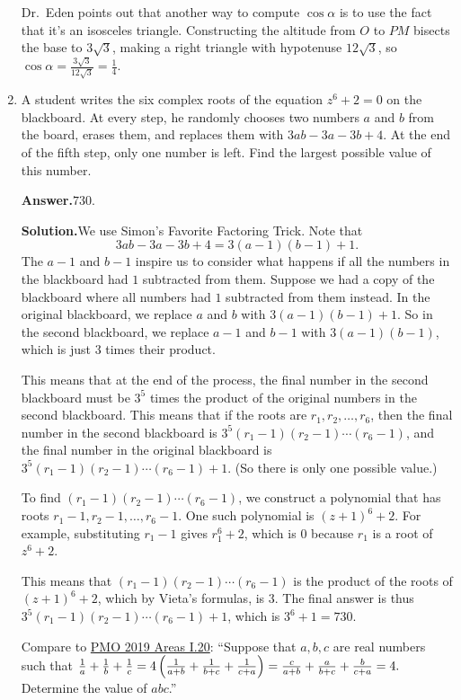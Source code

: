 \documentclass[11pt,paper=letter]{scrartcl}
\newcommand{\ans}{{\sffamily \bfseries Answer.}\;}
\newcommand{\sol}{{\sffamily \bfseries Solution.}\;}
\newcommand{\rem}[1]{{\small \sffamily \sansmath {\bfseries Remark.} #1}}
\begin{document}
\begin{enumerate}[left=0pt]
\rem{Dr.~Eden points out that another way to compute $\cos \alpha$ is to use the fact that it's an isosceles triangle. Constructing the altitude from $O$ to $PM$ bisects the base to $3\sqrt{3}$, making a right triangle with hypotenuse $12\sqrt{3}$, so $\cos \alpha = \frac{3\sqrt{3}}{12\sqrt{3}} = \frac{1}{4}$.}

\item A student writes the six complex roots of the equation $z^6 + 2 = 0$ on the blackboard. At every step, he randomly chooses two numbers $a$ and $b$ from the board, erases them, and replaces them with $3ab - 3a - 3b + 4$. At the end of the fifth step, only one number is left. Find the largest possible value of this number.

\ans $\boxed{730}$.

\sol We use Simon's Favorite Factoring Trick. Note that \[
  3ab - 3a - 3b + 4 = 3(a - 1)(b - 1) + 1.
\]
The $a-1$ and $b-1$ inspire us to consider what happens if all the numbers in the blackboard had $1$ subtracted from them. Suppose we had a copy of the blackboard where all numbers had $1$ subtracted from them instead. In the original blackboard, we replace $a$ and $b$ with $3(a-1)(b-1) + 1$. So in the second blackboard, we replace $a-1$ and $b-1$ with $3(a-1)(b-1)$, which is just $3$ times their product.

This means that at the end of the process, the final number in the second blackboard must be $3^5$ times the product of the original numbers in the second blackboard. This means that if the roots are $r_1, r_2, \ldots, r_6$, then the final number in the second blackboard is $3^5(r_1 - 1)(r_2 - 1)\cdots (r_6 - 1)$, and the final number in the original blackboard is $3^5(r_1 - 1)(r_2 - 1)\cdots (r_6 - 1) + 1$. (So there is only one possible value.)

To find $(r_1 - 1)(r_2 - 1)\cdots(r_6 - 1)$, we construct a polynomial that has roots $r_1 - 1, r_2 - 1, \ldots, r_6 - 1$. One such polynomial is $(z + 1)^6 + 2$. For example, substituting $r_1 - 1$ gives $r_1^6 + 2$, which is $0$ because $r_1$ is a root of $z^6 + 2$.

This means that $(r_1 - 1)(r_2 - 1)\cdots(r_6 - 1)$ is the product of the roots of $(z + 1)^6 + 2$, which by Vieta's formulas, is $3$. The final answer is thus $3^5(r_1 - 1)(r_2 - 1)\cdots (r_6 - 1) + 1$, which is $3^6 + 1 = 730$.

\rem{Compare to \href{https://cjquines.com/files/pmo2019areas.pdf}{PMO 2019 Areas I.20{}}: ``Suppose that $a, b, c$ are real numbers such that $\frac1a + \frac1b + \frac1c = 4\left( \frac1{a+b} + \frac1{b+c} + \frac1{c+a} \right) = \frac c{a+b} + \frac a{b+c} + \frac b{c+a} = 4.$ Determine the value of $abc$.''}

\end{enumerate}
\end{document}
